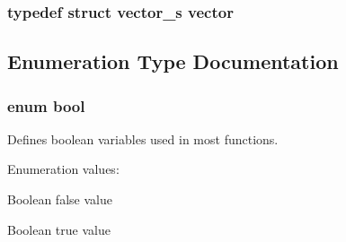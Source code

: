 \subsubsection{\setlength{\rightskip}{0pt plus 5cm}typedef struct {\bf vector\_\-s} vector}\label{defines_8h_a120}




\subsection{Enumeration Type Documentation}
\subsubsection{\setlength{\rightskip}{0pt plus 5cm}enum bool}\label{defines_8h_a139}


Defines boolean variables used in most functions. \begin{Desc}
\item[Enumeration values:]\par
\begin{description}
\item[{\em 
{\em FALSE}\label{defines_8h_a139a137}
}]Boolean false value \item[{\em 
{\em TRUE}\label{defines_8h_a139a138}
}]Boolean true value \end{description}
\end{Desc}


